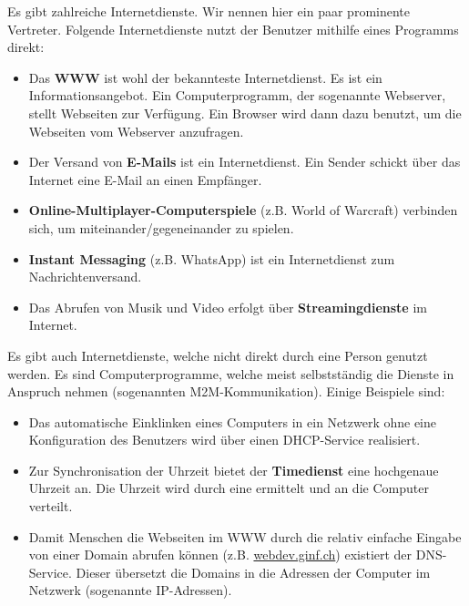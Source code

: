 \begin{example}
Es gibt zahlreiche Internetdienste. Wir nennen hier ein paar prominente Vertreter. Folgende Internetdienste nutzt der Benutzer mithilfe eines Programms direkt:

\begin{itemize}
	\item Das \textbf{\ac{WWW}} ist wohl der bekannteste Internetdienst. Es ist ein Informationsangebot. Ein Computerprogramm, der sogenannte Webserver, stellt Webseiten zur Verfügung. Ein Browser wird dann dazu benutzt, um die Webseiten vom Webserver anzufragen.
	\item Der Versand von \textbf{E-Mails} ist ein Internetdienst. Ein Sender schickt über das Internet eine E-Mail an einen Empfänger.
	\item \textbf{Online-Multiplayer-Computerspiele} (z.B. World of Warcraft) verbinden sich, um miteinander/gegeneinander zu spielen.
	\item \textbf{Instant Messaging} (z.B. WhatsApp) ist ein Internetdienst zum Nachrichtenversand.
	\item Das Abrufen von Musik und Video erfolgt über \textbf{Streamingdienste} im Internet.
\end{itemize}

Es gibt auch Internetdienste, welche nicht direkt durch eine Person genutzt werden. Es sind Computerprogramme, welche meist selbstständig die Dienste in Anspruch nehmen (sogenannten \ac{M2M}-Kommunikation). Einige Beispiele sind:

\begin{itemize}
	\item Das automatische Einklinken eines Computers in ein Netzwerk ohne eine Konfiguration des Benutzers wird über einen \ac{DHCP}-Service realisiert.
	\item Zur Synchronisation der Uhrzeit bietet der \textbf{Timedienst} eine hochgenaue Uhrzeit an. Die Uhrzeit wird durch eine  ermittelt und an die Computer verteilt.
	\item Damit Menschen die Webseiten im \ac{WWW} durch die relativ einfache Eingabe von einer Domain abrufen können (z.B. \url{webdev.ginf.ch}) existiert der \ac{DNS}-Service. Dieser übersetzt die Domains in die  Adressen der Computer im Netzwerk (sogenannte \ac{IP}-Adressen).
\end{itemize}

\end{example}

